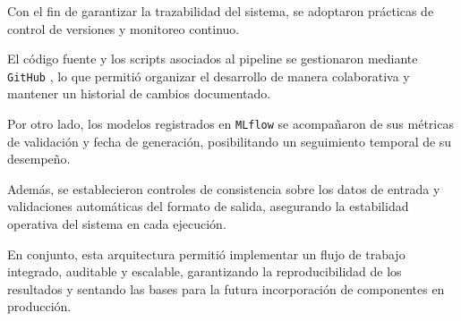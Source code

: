 Con el fin de garantizar la trazabilidad del sistema, se adoptaron prácticas de control de versiones y monitoreo continuo.  

El código fuente y los scripts asociados al pipeline se gestionaron mediante \texttt{GitHub} \cite{ARTICLE:GitHub}, lo que permitió organizar el desarrollo de manera colaborativa y mantener un historial de cambios documentado.  

Por otro lado, los modelos registrados en \texttt{MLflow} se acompañaron de sus métricas de validación y fecha de generación, posibilitando un seguimiento temporal de su desempeño.  

Además, se establecieron controles de consistencia sobre los datos de entrada y validaciones automáticas del formato de salida, asegurando la estabilidad operativa del sistema en cada ejecución.  

En conjunto, esta arquitectura permitió implementar un flujo de trabajo integrado, auditable y escalable, garantizando la reproducibilidad de los resultados y sentando las bases para la futura incorporación de componentes en producción.



